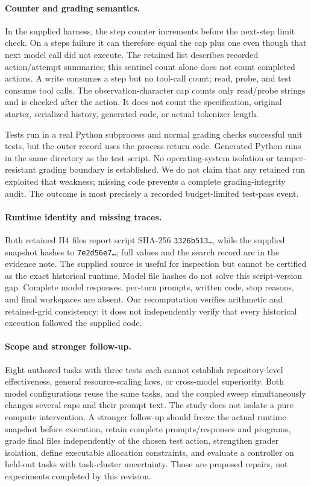 \documentclass[11pt]{article}
\begin{document}
\paragraph{Counter and grading semantics.}
In the supplied harness, the step counter increments before the next-step limit check. On a steps failure it can therefore equal the cap plus one even though that next model call did not execute. The retained list describes recorded action/attempt summaries; this sentinel count alone does not count completed actions. A write consumes a step but no tool-call count; read, probe, and test consume tool calls. The observation-character cap counts only read/probe strings and is checked after the action. It does not count the specification, original starter, serialized history, generated code, or actual tokenizer length.

Tests run in a real Python subprocess and normal grading checks successful unit tests, but the outer record uses the process return code. Generated Python runs in the same directory as the test script. No operating-system isolation or tamper-resistant grading boundary is established. We do not claim that any retained run exploited that weakness; missing code prevents a complete grading-integrity audit. The outcome is most precisely a recorded budget-limited test-pass event.

\paragraph{Runtime identity and missing traces.}
Both retained H4 files report script SHA-256 \texttt{3326b513\ldots}, while the supplied snapshot hashes to \texttt{7e2d56e7\ldots}; full values and the search record are in the evidence note. The supplied source is useful for inspection but cannot be certified as the exact historical runtime. Model file hashes do not solve this script-version gap. Complete model responses, per-turn prompts, written code, stop reasons, and final workspaces are absent. Our recomputation verifies arithmetic and retained-grid consistency; it does not independently verify that every historical execution followed the supplied code.

\paragraph{Scope and stronger follow-up.}
Eight authored tasks with three tests each cannot establish repository-level effectiveness, general resource-scaling laws, or cross-model superiority. Both model configurations reuse the same tasks, and the coupled sweep simultaneously changes several caps and their prompt text. The study does not isolate a pure compute intervention. A stronger follow-up should freeze the actual runtime snapshot before execution, retain complete prompts/responses and programs, grade final files independently of the chosen test action, strengthen grader isolation, define executable allocation constraints, and evaluate a controller on held-out tasks with task-cluster uncertainty. Those are proposed repairs, not experiments completed by this revision.
\end{document}
